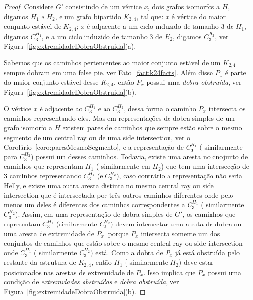 \begin{proof}
Considere $G'$ consistindo de um vértice $x$, dois grafos isomorfos a  $H$, digamos $ H_1 $ e $ H_2 $, e um grafo bipartido $K_{2,4}$, tal que: $x$ é vértice do maior conjunto estável de $K_{2,4}$; $x$ é adjacente a um ciclo induzido de tamanho 3 de $H_1$, digamos $C_3^{H_1}$, e a um ciclo induzido de tamanho  3 de $H_2$, digamos $ C_3^{H_2}$, ver Figura~\ref{fig:extremidadeDobraObstruida}(a).

Sabemos que os caminhos pertencentes ao maior conjunto estável de um $K_{2,4}$ sempre dobram em uma  false pie, ver Fato~\ref{fact:k24facts}. Além disso $P_x$ é parte do maior conjunto estável desse  $K_{2,4}$, então $P_x$ possui uma \emph {dobra obstruída}, ver Figura~\ref{fig:extremidadeDobraObstruida}(b). 

O vértice  $x$ é adjacente ao $ C_{3}^{H_1}$ e ao $ C_3^{H_2}$, dessa forma o caminho $ P_x $ intersecta os caminhos representando eles. Mas em representações de dobra simples de um grafo isomorfo a $H$ existem pares de caminhos que sempre estão sobre o mesmo segmento de um central ray ou de uma side intersection, ver o Corolário~\ref{coro:paresMesmoSegmento}, e a representação de  $C_{3}^{H_1}$ ( similarmente para $C_3^{H_2})$ possui um desses caminhos. Todavia, existe uma aresta no cnojunto de caminhos que representam  ${H_1}$ ( similarmente em ${H_2}$) que tem uma intersecção de   3 caminhos representando $ C_{3}^{H_1}$ (e $ C_3^{H_2}$), caso contrário a representação não seria Helly, e existe  uma outra aresta distinta no mesmo  central ray ou side intersection que é intersectada por três outros caminhos diferentes onde pelo menos um deles é diferentes dos caminhos correspondentes a $C_{3}^{H_1}$ ( similarmente $C_3^{H_2}$). Assim, em uma representação de dobra simples de  $G'$, os caminhos que representam  $C_{3}^{H_1}$ (similarmente $C_3^{H_2})$ devem intersectar uma aresta de dobra ou uma aresta de extremidade de $P_x$, porque $P_x$ intersecta somente um dos conjuntos de caminhos que estão sobre o mesmo central ray ou side intersection onde  $C_{3}^{H_1}$ ( similarmente $C_3^{H_2})$ está. Como a dobra de   $P_x$ já está obstruída pelo restante da estrutura de $K_{2,4}$, então ${H_1}$ ( similarmente ${H_2}$) deve estar posicionados nas arestas de extremidade de  $P_x$. Isso implica que  $ P_x $ possui uma condição de \emph{extremidades obstruídas} e \emph{dobra obstruída}, ver Figura~\ref{fig:extremidadeDobraObstruida}(b).

\end{proof}




